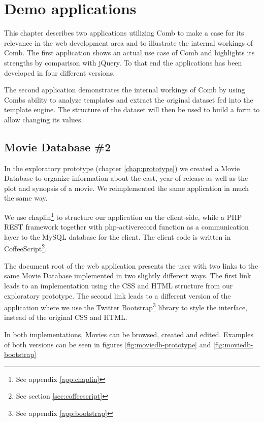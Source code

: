 \documentclass[thesis.tex]{subfiles}
\begin{document}
\chapter{Demo applications}
\label{chap:demo}
This chapter describes two applications utilizing Comb to make a case for
its relevance in the web development area and to illustrate the internal
workings of Comb.
The first application shows an actual use case of Comb and highlights its
strengths by comparison with jQuery. To that end the applications has been
developed in four different versions.

The second application demonstrates the internal workings of Comb by using Combs
ability to analyze templates and extract the original dataset fed into the
template engine. The structure of the dataset will then be used to build a form
to allow changing its values.

\section{Movie Database \#2}
In the exploratory prototype (chapter \ref{chap:prototype}) we created a
Movie Database to organize information about the cast, year of release as well
as the plot and synopsis of a movie. We reimplemented the same application
in much the same way.

We use chaplin\footnote{See appendix \ref{app:chaplin}} to structure our
application on the client-side, while a PHP REST framework together with
php-activerecord function as a communication layer to the MySQL database for the
client.
The client code is written in CoffeeScript\footnote{See
section \ref{sec:coffeescript}}.

The document root of the web application presents the user with two links to
the same Movie Database implemented in two slightly different ways.
The first link leads to an implementation using the CSS and HTML structure from
our exploratory prototype.
The second link leads to a different version of the application where we use the
Twitter Bootstrap\footnote{See appendix \ref{app:bootstrap}} library to style
the interface, instead of the original CSS and HTML.

In both implementations, Movies can be browsed, created and edited. Examples of
both versions can be seen in figures \ref{fig:moviedb-prototype} and
\ref{fig:moviedb-bootstrap}
\end{document}
